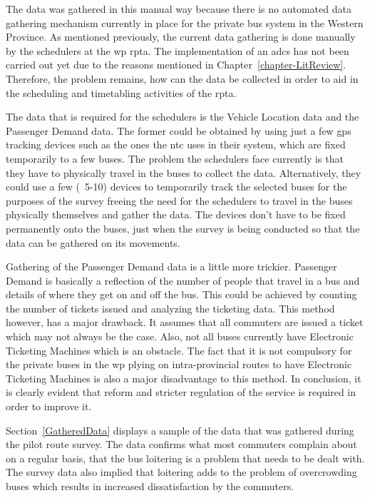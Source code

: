 The data was gathered in this manual way because there is no automated data gathering mechanism currently in place for the private bus system in the Western Province. As mentioned previously, the current data gathering is done manually by the schedulers at the \acrshort{wp} \acrshort{rpta}. The implementation of an \acrshort{adcs} has not been carried out yet due to the reasons mentioned in Chapter~\ref{chapter-LitReview}. Therefore, the problem remains, how can the data be collected in order to aid in the scheduling and timetabling activities of the \acrshort{rpta}.

The data that is required for the schedulers is the Vehicle Location data and the Passenger Demand data. The former could be obtained by using just a few \acrshort{gps} tracking devices such as the ones the \acrshort{ntc} uses in their system, which are fixed temporarily to a few buses. The problem the schedulers face currently is that they have to physically travel in the buses to collect the data. Alternatively, they could use a few (~5-10) devices to temporarily track the selected buses for the purposes of the survey freeing the need for the schedulers to travel in the buses physically themselves and gather the data. The devices don't have to be fixed permanently onto the buses, just when the survey is being conducted so that the data can be gathered on its movements.

Gathering of the Passenger Demand data is a little more trickier. Passenger Demand is basically a reflection of the number of people that travel in a bus and details of where they get on and off the bus. This could be achieved by counting the number of tickets issued and analyzing the ticketing data. This method however, has a major drawback. It assumes that all commuters are issued a ticket which may not always be the case. Also, not all buses currently have Electronic Ticketing Machines which is an obstacle. The fact that it is not compulsory for the private buses in the \acrshort{wp} plying on intra-provincial routes to have Electronic Ticketing Machines is also a major disadvantage to this method. In conclusion, it is clearly evident that reform and stricter regulation of the service is required in order to improve it.

Section~\ref{GatheredData} displays a sample of the data that was gathered during the pilot route survey. The data confirms what most commuters complain about on a regular basis, that the bus loitering is a problem that needs to be dealt with. The survey data also implied that loitering adds to the problem of overcrowding buses which results in increased dissatisfaction by the commuters.

